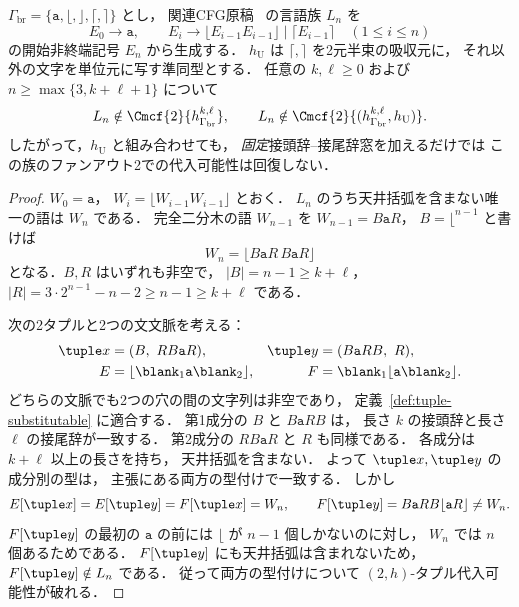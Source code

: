 \begin{proposition}
\label{prop:fixed-window-doubling-fanout-two}
$\Gamma_{\mathrm{br}}=\{\mathtt a,\lfloor,\rfloor,\lceil,\rceil\}$ とし，
関連CFG原稿~\cite{kuriyamaCFG} の言語族 $L_n$ を
\[
 E_0\to\mathtt a,\qquad
 E_i\to\lfloor E_{i-1}E_{i-1}\rfloor
       \mid\lceil E_{i-1}\rceil\quad(1\le i\le n)
\]
の開始非終端記号 $E_n$ から生成する．
$h_{\mathrm U}$ は $\lceil,\rceil$ を2元半束の吸収元に，
それ以外の文字を単位元に写す準同型とする．
任意の $k,\ell\ge0$ および
$n\ge\max\{3,k+\ell+1\}$ について
\[
 L_n\notin\Cmcf{2}{h_{\Gamma_{\mathrm{br}}}^{k,\ell}},
 \qquad
 L_n\notin\Cmcf{2}{(h_{\Gamma_{\mathrm{br}}}^{k,\ell},h_{\mathrm U})}.
\]
したがって，$h_{\mathrm U}$ と組み合わせても，
\emph{固定}接頭辞--接尾辞窓を加えるだけでは
この族のファンアウト2での代入可能性は回復しない．
\end{proposition}
\begin{proof}
$W_0=\mathtt a$，
$W_i=\lfloor W_{i-1}W_{i-1}\rfloor$ とおく．
$L_n$ のうち天井括弧を含まない唯一の語は $W_n$ である．
完全二分木の語 $W_{n-1}$ を
$W_{n-1}=B\mathtt a R$，
$B=\lfloor^{n-1}$ と書けば
\[
 W_n=\lfloor B\mathtt a R\,B\mathtt a R\rfloor
\]
となる．$B,R$ はいずれも非空で，
$|B|=n-1\ge k+\ell$，
$|R|=3\cdot2^{n-1}-n-2\ge n-1\ge k+\ell$ である．

次の2タプルと2つの文文脈を考える：
\[
 \begin{aligned}
 \tuple x&=(B,\ R B\mathtt a R),&
 \tuple y&=(B\mathtt a R B,\ R),\\
 E&=\lfloor\blank_1\mathtt a\blank_2\rfloor,&
 F&=\blank_1\lfloor\mathtt a\blank_2\rfloor.
 \end{aligned}
\]
どちらの文脈でも2つの穴の間の文字列は非空であり，
定義~\ref{def:tuple-substitutable} に適合する．
第1成分の $B$ と $B\mathtt a R B$ は，
長さ $k$ の接頭辞と長さ $\ell$ の接尾辞が一致する．
第2成分の $R B\mathtt a R$ と $R$ も同様である．
各成分は $k+\ell$ 以上の長さを持ち，
天井括弧を含まない．
よって $\tuple x,\tuple y$ の成分別の型は，
主張にある両方の型付けで一致する．
しかし
\[
 E[\tuple x]=E[\tuple y]=F[\tuple x]=W_n,
 \qquad
 F[\tuple y]=B\mathtt a R B\lfloor\mathtt a R\rfloor
 \ne W_n.
\]
$F[\tuple y]$ の最初の $\mathtt a$ の前には
$\lfloor$ が $n-1$ 個しかないのに対し，
$W_n$ では $n$ 個あるためである．
$F[\tuple y]$ にも天井括弧は含まれないため，
$F[\tuple y]\notin L_n$ である．
従って両方の型付けについて
$(2,h)$-タプル代入可能性が破れる．
\end{proof}

